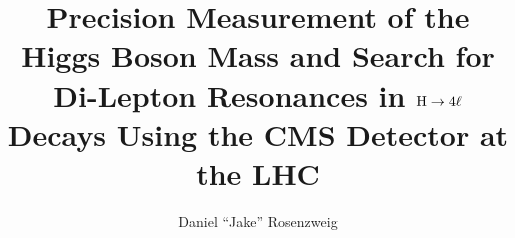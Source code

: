 \documentclass{ufdissertation}\sloppy
\title{Precision Measurement of the Higgs Boson Mass and Search for Di-Lepton Resonances in ${\rm H \rightarrow 4\ell}$ Decays Using the CMS Detector at the LHC}
\author{Daniel ``Jake'' Rosenzweig}%
\begin{document}
% 


\justify %

























%  
\end{document}
